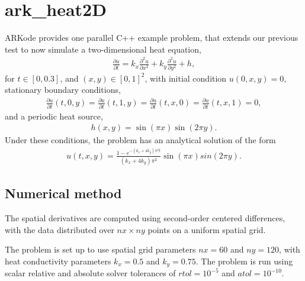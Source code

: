 \documentclass[letterpaper,10pt,english]{sphinxmanual}
\begin{document}
\section{ark\_heat2D}
\label{\detokenize{cpp_parallel:id1}}\label{\detokenize{cpp_parallel:ark-heat2d}}
ARKode provides one parallel C++ example problem, that extends our
previous {\hyperref[\detokenize{c_serial:ark-heat1d}]{}} test to now simulate a two-dimensional heat
equation,
\begin{equation*}
\begin{split}\frac{\partial u}{\partial t} = k_x \frac{\partial^2 u}{\partial x^2}
                              + k_y \frac{\partial^2 u}{\partial y^2} + h,\end{split}
\end{equation*}
for \(t \in [0, 0.3]\), and \((x,y) \in [0, 1]^2\), with initial
condition \(u(0,x,y) = 0\), stationary boundary conditions,
\begin{equation*}
\begin{split}\frac{\partial u}{\partial t}(t,0,y) = \frac{\partial u}{\partial t}(t,1,y) =
\frac{\partial u}{\partial t}(t,x,0) = \frac{\partial u}{\partial t}(t,x,1) = 0,\end{split}
\end{equation*}
and a periodic heat source,
\begin{equation*}
\begin{split}h(x,y) = \sin(\pi x) \sin(2\pi y).\end{split}
\end{equation*}
Under these conditions, the problem has an analytical solution of the
form
\begin{equation*}
\begin{split}u(t,x,y) = \frac{1 - e^{-(k_x+4k_y)\pi^2 t}}{(k_x+4k_y)\pi^2} \sin(\pi x) sin(2\pi y).\end{split}
\end{equation*}

\subsection{Numerical method}
\label{\detokenize{cpp_parallel:numerical-method}}
The spatial derivatives are computed using second-order centered
differences, with the data distributed over \(nx\times ny\) points
on a uniform spatial grid.

The problem is set up to use spatial grid parameters \(nx=60\) and
\(ny=120\), with heat conductivity parameters \(k_x=0.5\) and
\(k_y=0.75\).  The problem is run using scalar relative and
absolute solver tolerances of \(rtol=10^{-5}\) and
\(atol=10^{-10}\).
\end{document}
